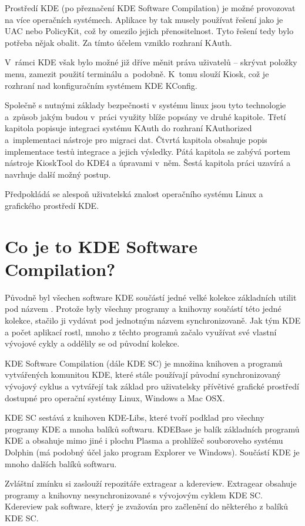 Prostředí KDE (po přeznačení KDE Software Compilation) je možné provozovat na více operačních systémech. Aplikace by tak musely používat řešení jako je UAC nebo PolicyKit, což by omezilo jejich přenositelnost. Tyto řešení tedy bylo potřeba nějak obalit. Za tímto účelem vzniklo rozhraní KAuth.

V~rámci KDE však bylo možné již dříve měnit práva uživatelů -- skrývat položky menu, zamezit použití terminálu a~podobně. K~tomu slouží Kiosk, což je rozhraní nad konfiguračním systémem KDE KConfig.

Společně s nutnými základy bezpečnosti v systému linux jsou tyto technologie a~způsob jakým budou v~práci využity blíže popsány ve druhé kapitole. Třetí kapitola popisuje integraci systému KAuth do rozhraní KAuthorized a~implementaci nástroje pro migraci dat. Čtvrtá kapitola obsahuje popis implementace testů integrace a jejich výsledky. Pátá kapitola se zabývá portem nástroje KioskTool do KDE4 a úpravami v~něm. Šestá kapitola práci uzavírá a navrhuje další možný postup.

Předpokládá se alespoň uživatelská znalost operačního systému Linux a grafického prostředí KDE.

\section{Co je to KDE Software Compilation?}
Původně byl všechen software KDE součástí jedné velké kolekce základních utilit pod názvem . Protože byly všechny programy a knihovny součástí této jedné kolekce, stačilo ji vydávat pod jednotným názvem synchronizovaně. Jak tým KDE a počet aplikací rostl, mnoho z těchto programů začalo využívat své vlastní vývojové cykly a oddělily se od původní kolekce.

KDE Software Compilation (dále KDE SC) je množina knihoven a programů vytvářených komunitou KDE, které stále používají původní synchronizovaný vývojový cyklus a vytvářejí tak základ pro uživatelsky přívětivé  grafické prostředí dostupné pro operační systémy Linux, Windows a Mac OSX.

KDE SC sestává z knihoven KDE-Libs, které tvoří podklad pro všechny programy KDE a mnoha balíků softwaru. KDEBase je balík základních programů KDE a obsahuje mimo jiné i plochu Plasma a prohlížeč souboroveho systému Dolphin (má podobný účel jako program Explorer ve Windows). Součástí KDE je mnoho dalších balíků softwaru.

Zvláštní zmínku si zaslouží repozitáře extragear a kdereview. Extragear obsahuje programy a knihovny nesynchronizované s vývojovým cyklem KDE SC. Kdereview pak software, který je zvažován pro začlenění do některého z balíků KDE SC.


